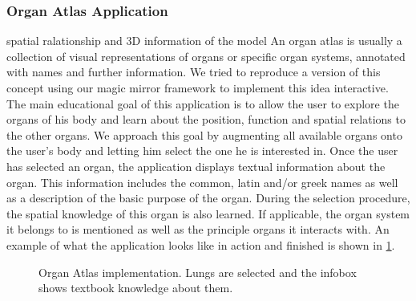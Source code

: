 \subsubsection{Organ Atlas Application} spatial ralationship and 3D information of the model 
An organ atlas is usually a collection of visual representations of organs or specific organ systems, annotated with names and further information.
We tried to reproduce a version of this concept using our magic mirror framework to implement this idea interactive. The main educational goal of this application is to allow the user to explore the organs of his body and learn about the position, function and spatial relations to the other organs.
We approach this goal by augmenting all available organs onto the user's body and letting him select the one he is interested in. Once the user has selected an organ, the application displays textual information about the organ. This information includes the common, latin and/or greek names as well as a description of the basic purpose of the organ. During the selection procedure, the spatial knowledge of this organ is also learned. If applicable, the organ system it belongs to is mentioned as well as the principle organs it interacts with. An example of what the application looks like in action and finished is shown in \figurename{\ref{fig:3-IMR:OrganAtlas}}.
\begin{figure}
\centering
{}
\caption{Organ Atlas implementation. Lungs are selected and the infobox shows textbook knowledge about them.}
\label{fig:3-IMR:OrganAtlas}
\end{figure}

